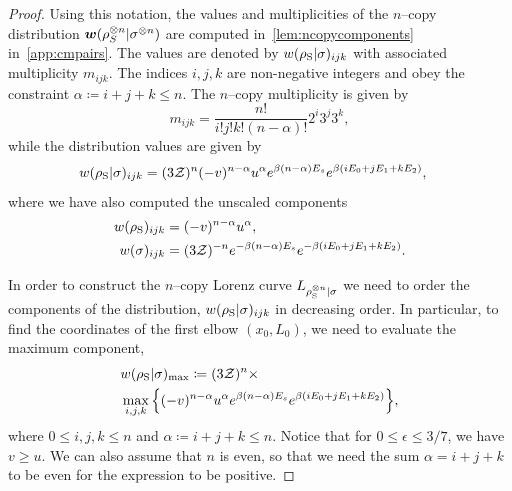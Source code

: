 \documentclass[pra,
aps,
twocolumn,
superscriptaddress,
groupedaddress,
nofootinbib,
reprint
]{revtex4-1}
\begin{document}
\begin{proof}
Using this notation, the values and multiplicities of the $n$--copy distribution $\bm{w}(\rho^{\otimes n}_S |\sigma^{\otimes n})$ are computed in~\cref{lem:ncopycomponents} in~\cref{app:cmpairs}. The values are denoted by $w(\rho_{\rm{S}} | \sigma)_{ijk}$ with associated multiplicity $m_{ijk}$. The indices $i,j,k$ are non-negative integers and obey the constraint $\alpha \coloneqq i+j+k \leq n$.
The $n$--copy multiplicity is given by
\begin{equation}
	m_{ijk} = \frac{n!}{i!j!k!(n-\alpha)!} 2^i 3^j 3^k,
\end{equation}
while the distribution values are given by
\begin{align}\label{eq:ncopy_w_rescaled}
	w(\rho_{\rm{S}} | \sigma)_{ijk} &= (3\mathcal{Z})^{n} (-v)^{n-\alpha} u^{\alpha} e^{\beta (n-\alpha)E_s} e^{\beta ( i E_0 + j E_1 + k E_2 )},
\end{align}
where we have also computed the unscaled components
\begin{align}
	w(\rho_{\rm{S}})_{ijk} &= (-v)^{n-\alpha} u^{\alpha}, \label{eq:ncopy_wrho}\\
	w(\sigma)_{ijk} &= (3\mathcal{Z})^{-n} e^{-\beta (n-\alpha)E_s} e^{-\beta ( i E_0 + j E_1 + k E_2 )}. \label{eq:ncopy_wsigma}
\end{align}

In order to construct the $n$--copy Lorenz curve ${L_{\rho_{\rm{S}}^{\otimes n}|\sigma}}$ we need to order the components of the distribution, $w(\rho_{\rm{S}} | \sigma)_{ijk}$ in decreasing order.
In particular, to find the coordinates of the first elbow $(x_0, L_0)$, we need to evaluate the maximum component,
\begin{align}
	&w(\rho_{\rm{S}} | \sigma)_{\rm{max}} \coloneqq (3\mathcal{Z})^{n}\times \nonumber\\
	&\max\limits_{i,j,k}\Big\{ (-v)^{n-\alpha} u^{\alpha} e^{\beta (n-\alpha)E_s} e^{\beta ( i E_0 + j E_1 + k E_2 )} \Big\}, \label{eq:max_slope}
\end{align}
where $0 \leq i,j,k \leq n$ and $\alpha \coloneqq i+j+k \leq n$.
Notice that for $0 \leq \epsilon \leq 3/7$, we have $v \geq u$. 
We can also assume that $n$ is even, so that we need the sum $\alpha = i+j+k$ to be even for the expression to be positive. 


\end{proof}
\end{document}
